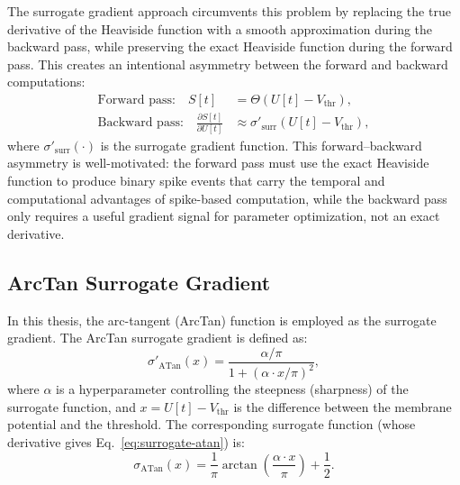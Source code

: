 The surrogate gradient approach circumvents this problem by replacing the true derivative of the Heaviside function with a smooth approximation during the backward pass, while preserving the exact Heaviside function during the forward pass. This creates an intentional asymmetry between the forward and backward computations:
\begin{align}
\text{Forward pass:} \quad S[t] &= \Theta(U[t] - V_{\text{thr}}), \label{eq:forward-heaviside} \\
\text{Backward pass:} \quad \frac{\partial S[t]}{\partial U[t]} &\approx \sigma'_{\text{surr}}(U[t] - V_{\text{thr}}), \label{eq:backward-surrogate}
\end{align}
where $\sigma'_{\text{surr}}(\cdot)$ is the surrogate gradient function. This forward--backward asymmetry is well-motivated: the forward pass must use the exact Heaviside function to produce binary spike events that carry the temporal and computational advantages of spike-based computation, while the backward pass only requires a useful gradient signal for parameter optimization, not an exact derivative.

\subsection{ArcTan Surrogate Gradient}

In this thesis, the arc-tangent (ArcTan) function is employed as the surrogate gradient. The ArcTan surrogate gradient is defined as:
\begin{equation}
\sigma'_{\text{ATan}}(x) = \frac{\alpha / \pi}{1 + \left(\alpha \cdot x / \pi\right)^2},
\label{eq:surrogate-atan}
\end{equation}
where $\alpha$ is a hyperparameter controlling the steepness (sharpness) of the surrogate function, and $x = U[t] - V_{\text{thr}}$ is the difference between the membrane potential and the threshold. The corresponding surrogate function (whose derivative gives Eq.~\eqref{eq:surrogate-atan}) is:
\begin{equation}
\sigma_{\text{ATan}}(x) = \frac{1}{\pi} \arctan\left(\frac{\alpha \cdot x}{\pi}\right) + \frac{1}{2}.
\label{eq:surrogate-atan-function}
\end{equation}

